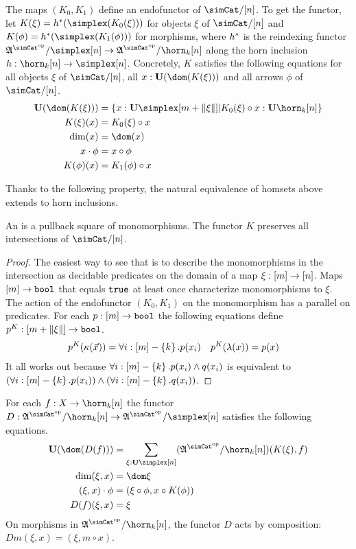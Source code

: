 \documentclass[csh.tex]{subfiles}
\begin{document}
\begin{definition}
The maps $(K_0,K_1)$ define an endofunctor of $\simCat/[n]$. To get the functor, let $K(\xi) = h\ri(\simplex(K_0(\xi)))$ for objects $\xi$ of $\simCat/[n]$ and $K(\phi) = h\ri(\simplex(K_1(\phi)))$ for morphisms, where $h^*$ is the reindexing functor $\ambient\s/\simplex[n]\to\ambient\s/\horn_k[n]$ along the horn inclusion $h\of \horn_k[n]\to\simplex[n]$. Concretely, $K$ satisfies the following equations for all objects $\xi$ of $\simCat/[n]$, all $x\of \base(\dom(K(\xi)))$ and all arrows $\phi$ of $\simCat/[n]$.
\begin{align*}
\base(\dom(K(\xi))) &= \set{ x\of\base\simplex[m+\norm\xi]| K_0(\xi)\circ x\of\base\horn_k[n]}\\
K(\xi)(x) &= K_0(\xi)\circ x \\
\dim(x) &= \dom(x) \\
x\cdot\phi &= x\circ\phi \\
K(\phi)(x) &= K_1(\phi)\circ x
\end{align*}
\end{definition}

Thanks to the following property, the natural equivalence of homsets above extends to horn inclusions.

\begin{lemma} An  is a pullback square of monomorphisms. The functor $K$ preserves all intersections of $\simCat/[n]$. \end{lemma}

\begin{proof} The easiest way to see that is to describe the monomorphisms in the intersection as decidable predicates on the domain of a map $\xi:[m]\to[n]$. Maps $[m]\to\mathtt{bool}$ that equals $\mathtt{true}$ at least once characterize monomorphisms to $\xi$. The action of the endofunctor $(K_0,K_1)$ on the monomorphism has a parallel on predicates. For each $p:[m]\to\mathtt{bool}$ the following equations define $p^K: [m+\Vert \xi \Vert]\to\mathtt{bool}$. 
\begin{align*}
p^K(\kappa(\vec x)) &= \forall i:[m]-\left\{k\right\}.p(x_i) &
p^K(\lambda(x)) &= p(x)
\end{align*}
It all works out because $\forall i:[m]-\left\{k\right\}.p(x_i)\land q(x_i)$ is equivalent to $(\forall i:[m]-\left\{k\right\}.p(x_i))\land(\forall i:[m]-\left\{k\right\}.q(x_i))$.
\end{proof}

\begin{definition}
For each $f\of X\to\horn_k[n]$ the functor $D\of \ambient\s/\horn_k[n]\to\ambient\s/\simplex[n]$ satisfies the following equations.
\begin{align*}
\base(\dom(D(f))) &= \sum_{\xi\of\base\simplex[n]}(\ambient\s/\horn_k[n])(K(\xi),f)\\
\dim(\xi,x) &= \dom\xi\\
(\xi,x)\cdot\phi &= (\xi\circ\phi,x\circ K(\phi))\\
D(f)(\xi,x) &= \xi
\end{align*}
On morphisms in $\ambient\s/\horn_k[n]$, the functor $D$ acts by composition: $Dm(\xi,x) = (\xi,m\circ x)$. \label{descent functor}
\end{definition}
\end{document}
